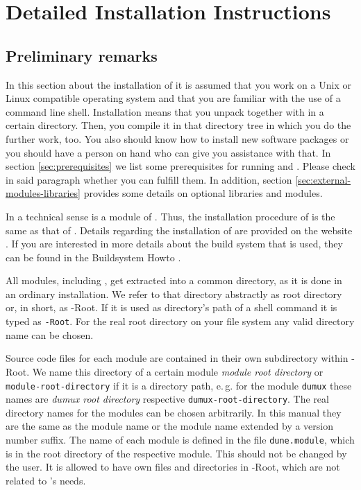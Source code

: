 \chapter{Detailed Installation Instructions} \label{install}
\section{Preliminary remarks}

In this section about the installation of \Dumux it is assumed that you work on a Unix or Linux compatible operating system
and that you are familiar with the use of a command line shell. Installation means that you unpack \Dune together with \Dumux in a certain directory.
Then, you compile it in that directory tree in which you do the further work, too. You also should know how to install new software packages
or you should have a person on hand who can give you assistance with that. In section \ref{sec:prerequisites} we list some prerequisites for running \Dune and \Dumux. 
Please check in said paragraph whether you can fulfill them. In addition, section \ref{sec:external-modules-libraries} provides some details on optional libraries and modules.

In a technical sense \Dumux is a module of \Dune. 
Thus, the installation procedure of \Dumux is the same as that of \Dune. 
Details regarding the installation of \Dune are provided on the \Dune website \cite{DUNE-INST}. 
If you are interested in more details about the build system that is used,
they can be found in the {\Dune} Buildsystem Howto \cite{DUNE-BS}.


All \Dune modules, including \Dumux, get extracted into a common directory, as it is done in an ordinary \Dune installation. 
We refer to that directory abstractly as {\Dune} root directory or, in short, as {\Dune}-Root. 
If it is used as directory's path of a shell command it is typed as \texttt{\Dune-Root}. 
For the real {\Dune} root directory on your file system any valid directory name can be chosen.

Source code files for each \Dune module are contained in their own subdirectory within {\Dune}-Root.
We name this directory of a certain module \emph{module root directory} or \texttt{module-root-directory} if it is a directory path,
e.\,g. for the module \texttt{dumux} these names are  \emph{dumux root directory} respective \texttt{dumux-root-directory}.
The real directory names for the modules can be chosen arbitrarily. In this manual they are the same as the
module name or the module name extended by a version number suffix.
The name of each \Dune module is defined in the file \texttt{dune.module}, which is in the root
directory of the respective module. This should not be changed by the user. 
It is allowed to have own files and directories in \Dune-Root, which are not related to \Dune's needs.

